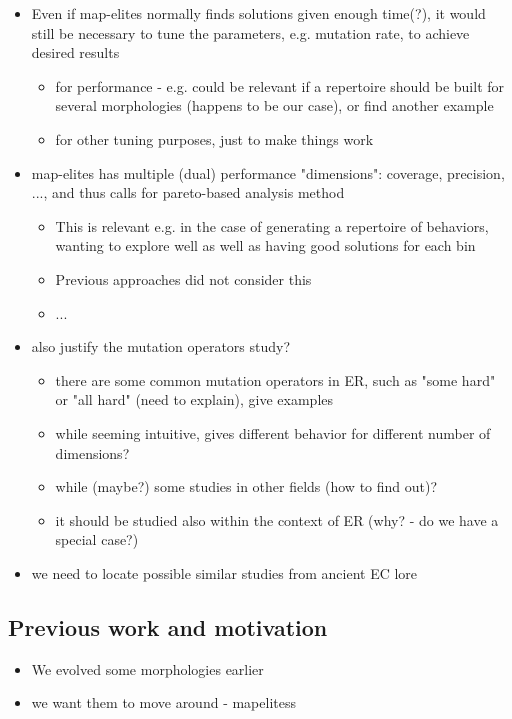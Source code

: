 \documentclass[sigconf, anonymous=false]{acmart}
\begin{document}
\begin{itemize}
\item Even if map-elites normally finds solutions given enough time(?), it would still be necessary to tune the parameters, e.g. mutation rate, to achieve desired results
\begin{itemize}
\item for performance - e.g. could be relevant if a repertoire should be built for several morphologies (happens to be our case), or find another example
\item for other tuning purposes, just to make things work

\end{itemize}

\item map-elites has multiple (dual) performance "dimensions": coverage, precision, ..., and thus calls for pareto-based analysis method
\begin{itemize}
\item This is relevant e.g. in the case of generating a repertoire of behaviors, wanting to explore well as well as having good solutions for each bin
\item Previous approaches did not consider this
\item ...
\end{itemize}

\item also justify the mutation operators study?
\begin{itemize}
\item there are some common mutation operators in ER, such as "some hard" or "all hard" (need to explain), give examples
\item while seeming intuitive, gives different behavior for different number of dimensions?
\item while (maybe?) some studies in other fields (how to find out)?
\item it should be studied also within the context of ER (why? - do we have a special case?)
\end{itemize}

\item we need to locate possible similar studies from ancient EC lore

\end{itemize}

\subsection{Previous work and motivation}
\begin{itemize}
\item We evolved some morphologies earlier
\item we want them to move around - mapelitess
\end{itemize}
\end{document}
